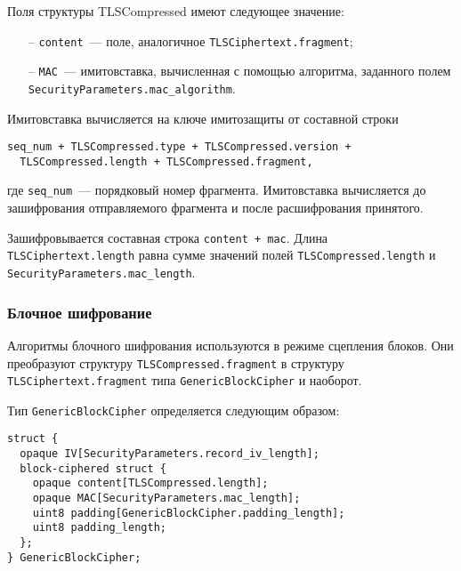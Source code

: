 Поля структуры TLSCompressed имеют следующее значение:
\begin{itemize}
\item[--] 
\lstinline{content}~--- поле, аналогичное 
\lstinline{TLSCiphertext.fragment}; 

\item[--]
\lstinline{MAC}~--- имитовставка, вычисленная с помощью алгоритма, 
заданного полем \lstinline{SecurityParameters.mac_algorithm}. 
\end{itemize}

Имитовставка вычисляется на ключе имитозащиты от составной строки 
\begin{lstlisting}
seq_num + TLSCompressed.type + TLSCompressed.version + 
  TLSCompressed.length + TLSCompressed.fragment, 
\end{lstlisting}
где \lstinline{seq_num}~--- порядковый номер фрагмента. Имитовставка 
вычисляется до зашифрования отправляемого фрагмента и после расшифрования 
принятого.  

Зашифровывается составная строка \lstinline{content + mac}. Длина 
\lstinline{TLSCiphertext.length}  равна сумме значений полей 
\lstinline{TLSCompressed.length} и  \lstinline{SecurityParameters.mac_length}.  

\subsubsection{Блочное шифрование}\label{RECORD.3.3.2} 

Алгоритмы блочного шифрования используются в режиме сцепления блоков. 
Они преобразуют структуру \lstinline{TLSCompressed.fragment} в структуру 
\lstinline{TLSCiphertext.fragment} типа \lstinline{GenericBlockCipher} 
и наоборот. 

Тип \lstinline{GenericBlockCipher} определяется следующим образом:
\begin{lstlisting}
struct {
  opaque IV[SecurityParameters.record_iv_length];
  block-ciphered struct {
    opaque content[TLSCompressed.length];
    opaque MAC[SecurityParameters.mac_length];
    uint8 padding[GenericBlockCipher.padding_length];
    uint8 padding_length;
  };
} GenericBlockCipher;
\end{lstlisting}

